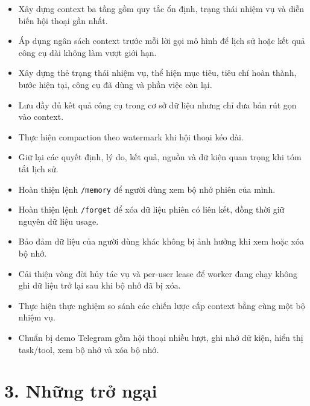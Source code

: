 \documentclass[12pt,a4paper]{article}
\begin{document}
\begin{itemize}
    \item Xây dựng context ba tầng gồm quy tắc ổn định, trạng thái nhiệm vụ và diễn biến hội thoại gần nhất.

    \item Áp dụng ngân sách context trước mỗi lời gọi mô hình để lịch sử hoặc kết quả công cụ dài không làm vượt giới hạn.

    \item Xây dựng thẻ trạng thái nhiệm vụ, thể hiện mục tiêu, tiêu chí hoàn thành, bước hiện tại, công cụ đã dùng và phần việc còn lại.

    \item Lưu đầy đủ kết quả công cụ trong cơ sở dữ liệu nhưng chỉ đưa bản rút gọn vào context.

    \item Thực hiện compaction theo watermark khi hội thoại kéo dài.

    \item Giữ lại các quyết định, lý do, kết quả, nguồn và dữ kiện quan trọng khi tóm tắt lịch sử.

    \item Hoàn thiện lệnh \texttt{/memory} để người dùng xem bộ nhớ phiên của mình.

    \item Hoàn thiện lệnh \texttt{/forget} để xóa dữ liệu phiên có liên kết, đồng thời giữ nguyên dữ liệu usage.

    \item Bảo đảm dữ liệu của người dùng khác không bị ảnh hưởng khi xem hoặc xóa bộ nhớ.

    \item Cải thiện vòng đời hủy tác vụ và per-user lease để worker đang chạy không ghi dữ liệu trở lại sau khi bộ nhớ đã bị xóa.

    \item Thực hiện thực nghiệm so sánh các chiến lược cấp context bằng cùng một bộ nhiệm vụ.

    \item Chuẩn bị demo Telegram gồm hội thoại nhiều lượt, ghi nhớ dữ kiện, hiển thị task/tool, xem bộ nhớ và xóa bộ nhớ.
\end{itemize}

\section*{3. Những trở ngại}
\end{document}
